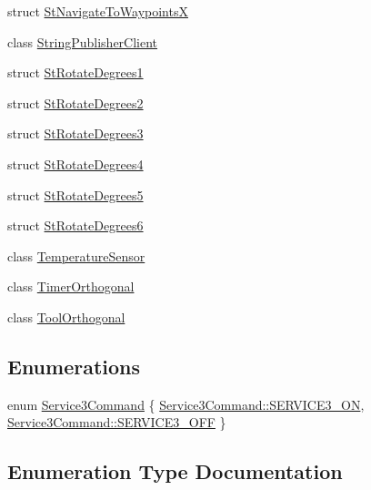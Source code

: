 \begin{DoxyCompactItemize}
\item 
struct \hyperlink{structsm__dance__bot_1_1StNavigateToWaypointsX}{St\+Navigate\+To\+WaypointsX}
\item 
class \hyperlink{classsm__dance__bot_1_1StringPublisherClient}{String\+Publisher\+Client}
\item 
struct \hyperlink{structsm__dance__bot_1_1StRotateDegrees1}{St\+Rotate\+Degrees1}
\item 
struct \hyperlink{structsm__dance__bot_1_1StRotateDegrees2}{St\+Rotate\+Degrees2}
\item 
struct \hyperlink{structsm__dance__bot_1_1StRotateDegrees3}{St\+Rotate\+Degrees3}
\item 
struct \hyperlink{structsm__dance__bot_1_1StRotateDegrees4}{St\+Rotate\+Degrees4}
\item 
struct \hyperlink{structsm__dance__bot_1_1StRotateDegrees5}{St\+Rotate\+Degrees5}
\item 
struct \hyperlink{structsm__dance__bot_1_1StRotateDegrees6}{St\+Rotate\+Degrees6}
\item 
class \hyperlink{classsm__dance__bot_1_1TemperatureSensor}{Temperature\+Sensor}
\item 
class \hyperlink{classsm__dance__bot_1_1TimerOrthogonal}{Timer\+Orthogonal}
\item 
class \hyperlink{classsm__dance__bot_1_1ToolOrthogonal}{Tool\+Orthogonal}
\end{DoxyCompactItemize}
\subsection*{Enumerations}
\begin{DoxyCompactItemize}
\item 
enum \hyperlink{namespacesm__dance__bot_a2d0902aa29698165effd2c3248a9c8ff}{Service3\+Command} \{ \hyperlink{namespacesm__dance__bot_a2d0902aa29698165effd2c3248a9c8ffa13cdca48a01bbb44fa8fb35567fbc58e}{Service3\+Command\+::\+S\+E\+R\+V\+I\+C\+E3\+\_\+\+ON}, 
\hyperlink{namespacesm__dance__bot_a2d0902aa29698165effd2c3248a9c8ffa642ed22a7f6b816840289b4256116e9e}{Service3\+Command\+::\+S\+E\+R\+V\+I\+C\+E3\+\_\+\+O\+FF}
 \}
\end{DoxyCompactItemize}


\subsection{Enumeration Type Documentation}
